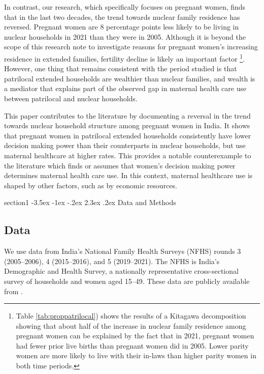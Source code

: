 \documentclass[12pt]{article}
\makeatletter
\renewcommand\section{\@startsection
{section}{1}{\z@}
{-3.5ex \@plus -1ex \@minus -.2ex}
{2.3ex \@plus.2ex}
{\centering\normalfont\Large\bfseries}}
\makeatother
\begin{document}
In contrast, our research, which specifically focuses on pregnant women, finds that in the last two decades, the trend towards nuclear family residence has reversed.  Pregnant women are 8 percentage points less likely to be living in nuclear households in 2021 than they were in 2005.  Although it is beyond the scope of this research note to investigate reasons for pregnant women's increasing residence in extended families, fertility decline is likely an important factor \footnote{Table \ref{tab:proppatrilocal}) shows the results of a Kitagawa decomposition showing that about half of the increase in nuclear family residence among pregnant women can be explained by the fact that in 2021, pregnant women had fewer prior live births than pregnant women did in 2005.  Lower parity women are more likely to live with their in-laws than higher parity women in both time periods.}. However, one thing that remains consistent with the period \cite{allendorf2013going} studied is that patrilocal extended households are wealthier than nuclear families, and wealth is a mediator that explains part of the observed gap in maternal health care use between patrilocal and nuclear households. 

This paper contributes to the literature by documenting a reversal in the trend towards nuclear household structure among pregnant women in India. It shows that pregnant women in patrilocal extended households consistently have lower decision making power than their counterparts in nuclear households, but use maternal healthcare at higher rates. This provides a notable counterexample to the literature which finds or assumes that women's decision making power determines maternal health care use.  In this context, maternal healthcare use is shaped by other factors, such as by economic resources.

\section{Data and Methods}

\subsection{Data} \label{sec:data}

We use data from India’s National Family Health Surveys (NFHS) rounds 3 (2005–2006), 4 (2015–2016), and 5 (2019–2021). The NFHS is India’s Demographic and Health Survey, a nationally representative cross-sectional survey of households and women aged 15–49. These data are publicly available from .
\end{document}
